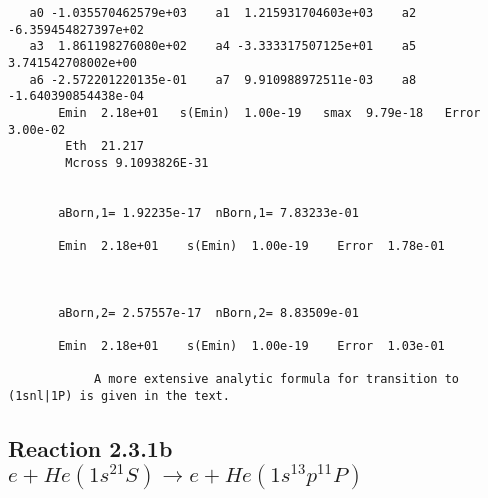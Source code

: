 \documentclass[12pt,dvipdfmx]{article}
\begin{document}
%










\begin{small}\begin{verbatim}
   a0 -1.035570462579e+03    a1  1.215931704603e+03    a2 -6.359454827397e+02
   a3  1.861198276080e+02    a4 -3.333317507125e+01    a5  3.741542708002e+00
   a6 -2.572201220135e-01    a7  9.910988972511e-03    a8 -1.640390854438e-04
       Emin  2.18e+01   s(Emin)  1.00e-19   smax  9.79e-18   Error  3.00e-02
        Eth  21.217
        Mcross 9.1093826E-31


       aBorn,1= 1.92235e-17  nBorn,1= 7.83233e-01

       Emin  2.18e+01    s(Emin)  1.00e-19    Error  1.78e-01



       aBorn,2= 2.57557e-17  nBorn,2= 8.83509e-01

       Emin  2.18e+01    s(Emin)  1.00e-19    Error  1.03e-01

            A more extensive analytic formula for transition to (1snl|1P) is given in the text.
\end{verbatim}\end{small}




\newpage
\subsection{
Reaction 2.3.1b $e + He(1s^21S) \rightarrow e + He(1s^13p^11P)$}






\end{document}

